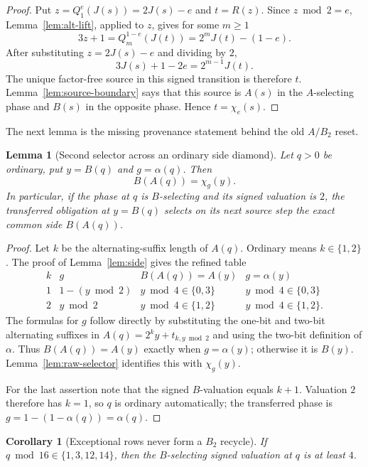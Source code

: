 \documentclass[11pt]{article}
\newtheorem{lemma}[theorem]{Lemma}
\newtheorem{corollary}[theorem]{Corollary}
\begin{document}
\begin{proof}
Put $z=Q_1^e(J(s))=2J(s)-e$ and $t=R(z)$.  Since
$z\bmod2=e$, Lemma~\ref{lem:alt-lift}, applied to $z$, gives for some
$m\ge1$
\[
 3z+1=Q_m^{1-e}(J(t))=2^mJ(t)-(1-e).
\]
After substituting $z=2J(s)-e$ and dividing by $2$,
\[
 3J(s)+1-2e=2^{m-1}J(t).
\]
The unique factor-free source in this signed transition is therefore $t$.
Lemma~\ref{lem:source-boundary} says that this source is $A(s)$ in the
$A$-selecting phase and $B(s)$ in the opposite phase.  Hence
$t=\chi_e(s)$.
\end{proof}

The next lemma is the missing provenance statement behind the old
$A/B_2$ reset.

\begin{lemma}[Second selector across an ordinary side diamond]
\label{lem:second-selector}
Let $q>0$ be ordinary, put $y=B(q)$ and $g=\alpha(q)$.  Then
\[
 \boxed{B(A(q))=\chi_g(y).}
\]
In particular, if the phase at $q$ is $B$-selecting and its signed valuation
is $2$, the transferred obligation at $y=B(q)$ selects on its next source
step the exact common side $B(A(q))$.
\end{lemma}

\begin{proof}
Let $k$ be the alternating-suffix length of $A(q)$.  Ordinary means
$k\in\{1,2\}$.  The proof of Lemma~\ref{lem:side} gives the refined table
\[
\begin{array}{c|c|c|c}
 k&g& B(A(q))=A(y) & g=\alpha(y)\\ \hline
 1&1-(y\bmod2)&y\bmod4\in\{0,3\}&y\bmod4\in\{0,3\}\\
 2&y\bmod2&y\bmod4\in\{1,2\}&y\bmod4\in\{1,2\}.
\end{array}
\]
The formulas for $g$ follow directly by substituting the one-bit and two-bit
alternating suffixes in $A(q)=2^k y+t_{k,y\bmod2}$ and using the two-bit
definition of $\alpha$.  Thus $B(A(q))=A(y)$ exactly when
$g=\alpha(y)$; otherwise it is $B(y)$.  Lemma~\ref{lem:raw-selector}
identifies this with $\chi_g(y)$.

For the last assertion note that the signed $B$-valuation equals $k+1$.
Valuation $2$ therefore has $k=1$, so $q$ is ordinary automatically; the
transferred phase is $g=1-(1-\alpha(q))=\alpha(q)$.
\end{proof}

\begin{corollary}[Exceptional rows never form a $B_2$ recycle]
\label{cor:exceptional-no-b2}
If $q\bmod16\in\{1,3,12,14\}$, then the $B$-selecting signed valuation at
$q$ is at least $4$.
\end{corollary}
\end{document}
